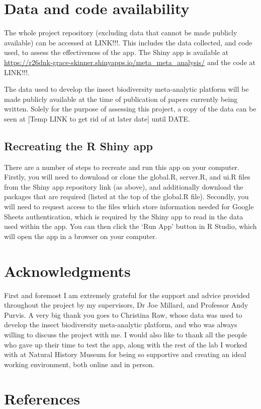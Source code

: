 \documentclass[11pt]{article}
\begin{document}
	\clearpage 
	
	\section{Data and code availability}
		The whole project repository (excluding data that cannot be made publicly available) can be accessed at LINK!!!. This includes the data collected, and code used, to assess the effectiveness of the app. The Shiny app is available at \url{https://r26dnk-grace-skinner.shinyapps.io/meta_meta_analysis/} and the code at LINK!!!. 
		
		\noindent The data used to develop the insect biodiversity meta-analytic platform will be made publicly available at the time of publication of papers currently being written. Solely for the purpose of assessing this project, a copy of the data can be seen at [Temp LINK to get rid of at later date] until DATE. 
		
		\subsection{Recreating the R Shiny app}
			There are a number of steps to recreate and run this app on your computer. Firstly, you will need to download or clone the global.R, server.R, and ui.R files from the Shiny app repository link (as above), and additionally download the packages that are required (listed at the top of the global.R file). Secondly, you will need to request access to the files which store information needed for Google Sheets authentication, which is required by the Shiny app to read in the data used within the app. You can then click the ‘Run App’ button in R Studio, which will open the app in a browser on your computer.
	
	\clearpage 	
		
	\section{Acknowledgments}	
		First and foremost I am extremely grateful for the support and advice provided throughout the project by my supervisors, Dr Joe Millard, and Professor Andy Purvis. A very big thank you goes to Christina Raw, whose data was used to develop the insect biodiversity meta-analytic platform, and who was always willing to discuss the project with me. I would also like to thank all the people who gave up their time to test the app, along with the rest of the lab I worked with at Natural History Museum for being so supportive and creating an ideal working environment, both online and in person. 
	
	\clearpage
	
	\section{References}
	\printbibliography[heading=none]

	
	
\end{document}
